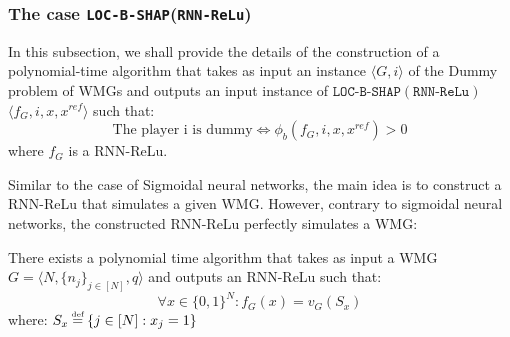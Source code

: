 \subsubsection{The case \texttt{LOC-B-SHAP}(\texttt{RNN-ReLu})} \label{app;subsec:bshaprnnrelu}
In this subsection, we shall provide the details of the construction of a polynomial-time algorithm that takes as input an instance $\langle G,i\rangle$ of the Dummy problem of WMGs and outputs an input instance of $\texttt{LOC-B-SHAP}(\texttt{RNN-ReLu})$ $\langle f_{G},i,x,x^{ref}\rangle$ such that:
$$\text{The player i is dummy} \iff \phi_{b}(f_{G},i,x,x^{ref}) > 0$$
where $f_{G}$ is a RNN-ReLu. 

Similar to the case of Sigmoidal neural networks, the main idea is to construct a RNN-ReLu that simulates a given WMG. However, contrary to  sigmoidal neural networks, the constructed RNN-ReLu perfectly simulates a WMG:

\begin{proposition} \label{app:prop:WMG2relu}
There exists a polynomial time algorithm that takes as input a WMG $G = \langle N, \{n_{j}\}_{j \in [N]}, q\rangle$ and outputs an RNN-ReLu such that: 
$$\forall x \in \{0,1\}^{N}: f_{G}(x) = v_{G}(S_{x})$$
where: $S_{x} \myeq \{j \in [N]: x_{j} = 1\}$ 
\end{proposition}

